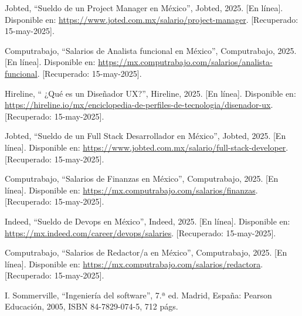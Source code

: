 \begin{thebibliography}{200}
    Jobted, “Sueldo de un Project Manager en México”, Jobted, 2025. [En línea]. Disponible en: \url{https://www.joted.com.mx/salario/project-manager}. [Recuperado: 15-may-2025].

    Computrabajo, “Salarios de Analista funcional en México”, Computrabajo, 2025. [En línea]. Disponible en: \url{https://mx.computrabajo.com/salarios/analista-funcional}. [Recuperado: 15-may-2025].

    Hireline, “ ¿Qué es un Diseñador UX?”, Hireline, 2025. [En línea]. Disponible en: \url{https://hireline.io/mx/enciclopedia-de-perfiles-de-tecnologia/disenador-ux}. [Recuperado: 15-may-2025].

    Jobted, “Sueldo de un Full Stack Desarrollador en México”, Jobted, 2025. [En línea]. Disponible en: \url{https://www.jobted.com.mx/salario/full-stack-developer}. [Recuperado: 15-may-2025].

    Computrabajo, “Salarios de Finanzas en México”, Computrabajo, 2025. [En línea]. Disponible en: \url{https://mx.computrabajo.com/salarios/finanzas}. [Recuperado: 15-may-2025].

    Indeed, “Sueldo de Devops en México”, Indeed, 2025. [En línea]. Disponible en: \url{https://mx.indeed.com/career/devops/salaries}. [Recuperado: 15-may-2025].

    Computrabajo, “Salarios de Redactor/a en México”, Computrabajo, 2025. [En línea]. Disponible en: \url{https://mx.computrabajo.com/salarios/redactora}. [Recuperado: 15-may-2025].

    I. Sommerville, “Ingeniería del software”, 7.ª ed. Madrid, España: Pearson Educación, 2005, ISBN 84-7829-074-5, 712 págs.
\end{thebibliography}
